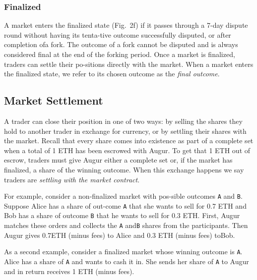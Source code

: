 \documentclass[12pt,floatfix,reprint,nofootinbib,amsmath,amssymb,epsfig,pre,floats,letterpaper,groupedaffiliation]{revtex4-1}
\theoremstyle{definition}
\theoremstyle{definition}
\begin{document}
\subsubsection{Finalized}

A market enters the finalized state (Fig.~2f) if it passes through a 7-day dispute round without having its tenta-\linebreak tive outcome successfully disputed, or after completion of\linebreak a fork. The outcome of a fork cannot be disputed and is always considered final at the end of the forking period. Once a market is finalized, traders can settle their po-\linebreak sitions directly with the market. When a market enters the finalized state, we refer to its chosen outcome as the \textit{final outcome}.

\subsection{Market Settlement}\label{section:settlement}

A trader can close their position in one of two ways: by selling the shares they hold to another trader in exchange for currency, or by settling their shares with the market. Recall that every share comes into existence as part of a complete set when a total of 1 ETH has been escrowed with Augur. To get that 1 ETH out of escrow, traders must give Augur either a complete set or, if the market has finalized, a share of the winning outcome. When this exchange happens we say traders are \textit{settling with the market contract}.

For example, consider a non-finalized market with pos-\linebreak sible outcomes \texttt{A} and \texttt{B}. Suppose Alice has a share of out-\linebreak come \texttt{A} that she wants to sell for 0.7 ETH and Bob has a share of outcome \texttt{B} that he wants to sell for 0.3 ETH. First, Augur matches these orders and collects the \texttt{A} and\linebreak \texttt{B} shares from the participants. Then Augur gives 0.7\linebreak ETH (minus fees) to Alice and 0.3 ETH (minus fees) to\linebreak Bob.

As a second example, consider a finalized market whose winning outcome is \texttt{A}. Alice has a share of \texttt{A} and wants to cash it in. She sends her share of \texttt{A} to Augur and in return receives 1 ETH (minus fees).
\end{document}
